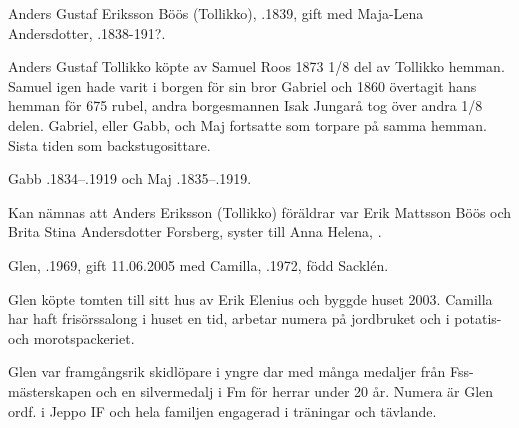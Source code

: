 Anders Gustaf Eriksson Böös (Tollikko), .1839, gift med Maja-Lena Andersdotter, .1838-191?.
\begin{jhchildren}
  \item {}
  \item {}
  \item {}
  \item {}
\end{jhchildren}
Anders Gustaf Tollikko köpte av Samuel Roos 1873 1/8 del av Tollikko 	hemman. Samuel igen hade varit i borgen för sin bror Gabriel och 1860 övertagit hans hemman för 675 rubel, andra borgesmannen Isak Jungarå tog över andra 1/8 delen. Gabriel, eller Gabb, och Maj fortsatte som torpare på samma hemman. Sista tiden som backstugosittare.

Gabb .1834--.1919 och Maj .1835--.1919.

Kan nämnas att Anders Eriksson (Tollikko) föräldrar var Erik	Mattsson Böös och Brita Stina Andersdotter Forsberg, syster till Anna Helena, .






Glen, .1969, gift 11.06.2005 med Camilla, .1972, född Sacklén.
\begin{jhchildren}
  \item {}
  \item {}
  \item {}
\end{jhchildren}

Glen köpte tomten till sitt hus av Erik Elenius och byggde huset 2003. Camilla har haft frisörssalong i huset en tid, arbetar numera på jordbruket och i potatis- och morotspackeriet.

Glen var framgångsrik skidlöpare i yngre dar med många medaljer från Fss-mästerskapen och en silvermedalj i Fm för herrar under 20 år. Numera är Glen ordf. i Jeppo IF och hela familjen engagerad i träningar och tävlande.




